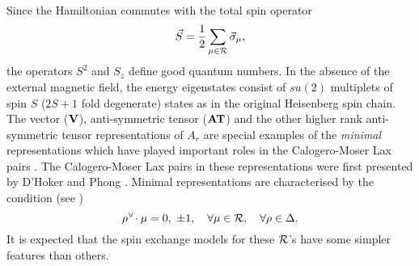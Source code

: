 \documentclass[a4paper,12pt]{article}
\begin{document}
Since the
Hamiltonian commutes with the total spin operator
\begin{equation}
\vec{S}={1\over2}\sum_{\mu\in{\cal R}}\vec{\sigma}_\mu,
\end{equation}
the operators $S^2$ and $S_z$ define good quantum numbers.
In the absence of the
external magnetic field, the energy eigenstates
consist of $su(2)$ multiplets of
spin $S$ ($2S+1$ fold degenerate) states  as in
the original Heisenberg spin chain.
  The vector (${\bf V}$),
anti-symmetric tensor (${\bf AT}$)
and the other higher rank anti-symmetric tensor representations
of $A_r$ are special
examples of the {\em minimal\/} representations which have played
important roles in
the Calogero-Moser Lax pairs \cite{DHoker_Phong,bcs1,bcs2,bms,cfs1}.
The Calogero-Moser Lax pairs in these representations were first presented
by
D'Hoker and Phong \cite{DHoker_Phong}.
Minimal representations are characterised by
the condition (see \cite{bcs1,bcs2})
\begin{equation}
\rho^\vee\!\cdot\mu=0,\ \pm1,\quad \forall \mu\in{\cal R},\quad
\forall\rho\in\Delta.
\end{equation}
It is expected that the spin exchange models for these ${\cal R}$'s have
some
simpler features than others.
\end{document}
